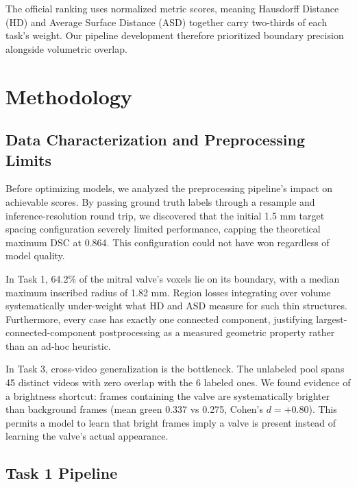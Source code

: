 \documentclass[runningheads]{llncs}
\begin{document}
The official ranking uses normalized metric scores, meaning Hausdorff Distance (HD) and Average Surface Distance (ASD) together carry two-thirds of each task's weight. Our pipeline development therefore prioritized boundary precision alongside volumetric overlap.

\section{Methodology}

\subsection{Data Characterization and Preprocessing Limits}

Before optimizing models, we analyzed the preprocessing pipeline's impact on achievable scores. By passing ground truth labels through a resample and inference-resolution round trip, we discovered that the initial 1.5 mm target spacing configuration severely limited performance, capping the theoretical maximum DSC at 0.864. This configuration could not have won regardless of model quality. 

In Task 1, 64.2\% of the mitral valve's voxels lie on its boundary, with a median maximum inscribed radius of 1.82 mm. Region losses integrating over volume systematically under-weight what HD and ASD measure for such thin structures. Furthermore, every case has exactly one connected component, justifying largest-connected-component postprocessing as a measured geometric property rather than an ad-hoc heuristic.

In Task 3, cross-video generalization is the bottleneck. The unlabeled pool spans 45 distinct videos with zero overlap with the 6 labeled ones. We found evidence of a brightness shortcut: frames containing the valve are systematically brighter than background frames (mean green 0.337 vs 0.275, Cohen's $d = +0.80$). This permits a model to learn that bright frames imply a valve is present instead of learning the valve's actual appearance.

\subsection{Task 1 Pipeline}
\end{document}
